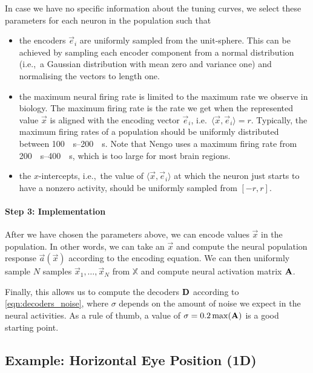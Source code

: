 \documentclass[10pt,letterpaper,oneside]{article}
\begin{document}
In case we have no specific information about the tuning curves, we select these parameters for each neuron in the population such that\textellipsis
\begin{itemize}
	\item \textellipsis the encoders $\vec e_i$ are uniformly sampled from the unit-sphere. This can be achieved by sampling each encoder component from a normal distribution (i.e.,~a Gaussian distribution with mean zero and variance one) and normalising the vectors to length one.
	\item \textellipsis the maximum neural firing rate is limited to the maximum rate we observe in biology. The maximum firing rate is the rate we get when the represented value $\vec x$ is aligned with the encoding vector $\vec e_i$, i.e.~$\langle \vec x, \vec e_i \rangle = r$. Typically, the maximum firing rates of a population should be uniformly distributed between \SIrange{100}{200}{\per\second}. Note that Nengo uses a maximum firing rate from \SIrange{200}{400}{\per\second}, which is too large for most brain regions.
	\item \textellipsis the $x$-intercepts, i.e.,~the value of $\langle \vec x, \vec e_i \rangle$ at which the neuron just starts to have a nonzero activity, should be uniformly sampled from $[-r, r]$.
\end{itemize}

\paragraph{Step 3: Implementation}
After we have chosen the parameters above, we can encode values $\vec x$ in the population. In other words, we can take an $\vec x$ and compute the neural population response $\vec a(\vec x)$ according to the encoding equation. We can then uniformly sample $N$ samples $\vec x_1, \ldots, \vec x_N$ from $\mathbb{X}$ and compute neural activation matrix ${\mathbf{A}}$.

Finally, this allows us to compute the decoders ${\mathbf{D}}$ according to \cref{eqn:decoders_noise}, where $\sigma$ depends on the amount of noise we expect in the neural activities. As a rule of thumb, a value of $\sigma = 0.2 \max({\mathbf{A}})$ is a good starting point.


\subsection{Example: Horizontal Eye Position (1D)}
\end{document}
